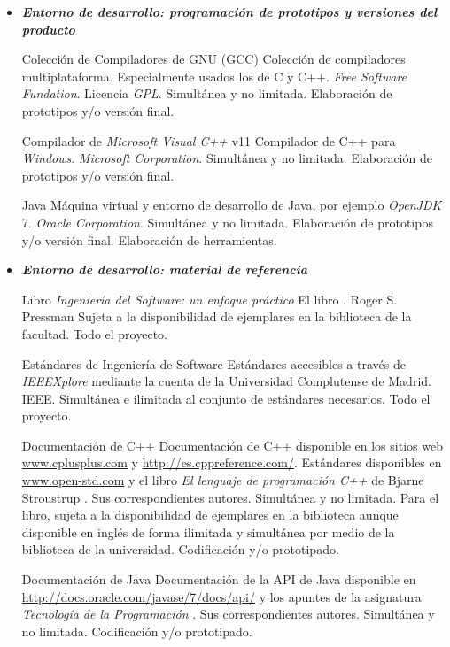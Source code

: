 \begin{itemize}
	\bigskip
	\item {\itshape \bfseries Entorno de desarrollo: programación de prototipos y versiones del producto} \\ \medskip
		
		{Colección de Compiladores de GNU (GCC)}
		{Colección de compiladores multiplataforma. Especialmente usados los de C y C++.}
		{\textit{Free Software Fundation}. Licencia \textit{GPL}.}
		{Simultánea y no limitada.}
		{Elaboración de prototipos y/o versión final.}

		{Compilador de \textit{Microsoft Visual C++} v11}
		{Compilador de C++ para \textit{Windows}.}
		{\textit{Microsoft Corporation}.}
		{Simultánea y no limitada.}
		{Elaboración de prototipos y/o versión final.}

		{Java}
		{Máquina virtual y entorno de desarrollo de Java, por ejemplo \textit{OpenJDK} 7.}
		{\textit{Oracle Corporation}.}
		{Simultánea y no limitada.}
		{Elaboración de prototipos y/o versión final. Elaboración de herramientas.}

	\bigskip
	\item {\itshape \bfseries Entorno de desarrollo: material de referencia} \\ \medskip

		{Libro \textit{Ingeniería del Software: un enfoque práctico}}
		{El libro \cite{PSMAN}.}
		{Roger S. Pressman}
		{Sujeta a la disponibilidad de ejemplares en la biblioteca de la facultad.}
		{Todo el proyecto.}

		{Estándares de Ingeniería de Software}
		{Estándares accesibles a través de \textit{IEEEXplore\marcaregistrada} mediante la cuenta de la Universidad Complutense de Madrid.}
		{IEEE.}
		{Simultánea e ilimitada al conjunto de estándares necesarios.}
		{Todo el proyecto.}

		{Documentación de C++}
		{Documentación de C++ disponible en los sitios web \url{www.cplusplus.com} y \url{http://es.cppreference.com/}. Estándares disponibles en \url{www.open-std.com} y el libro \emph{El lenguaje de programación C++} de Bjarne Stroustrup \cite{STROUSTRUP}.}
		{Sus correspondientes autores.}
		{Simultánea y no limitada. Para el libro, sujeta a la disponibilidad de ejemplares en la biblioteca aunque disponible
		en inglés de forma ilimitada y simultánea por medio de la biblioteca de la universidad.}
		{Codificación y/o prototipado.}

		{Documentación de Java}
		{Documentación de la API de Java disponible en \url{http://docs.oracle.com/javase/7/docs/api/} y los apuntes de la asignatura \textit{Tecnología de la Programación} \cite{AP_TP}.}
		{Sus correspondientes autores.}
		{Simultánea y no limitada.}
		{Codificación y/o prototipado.}
\end{itemize}

